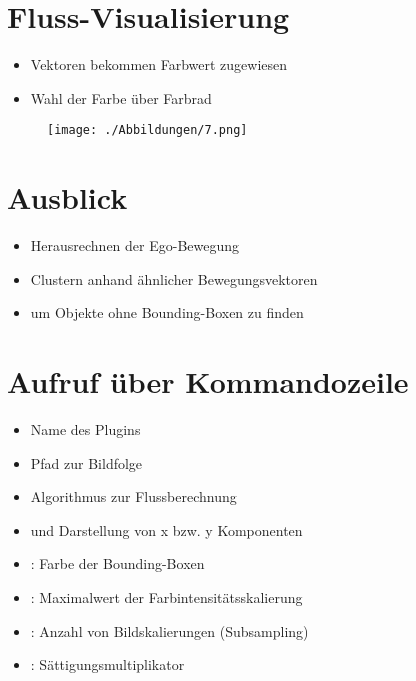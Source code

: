 \documentclass[10pt]{beamer}
\begin{document}
\section{Fluss-Visualisierung}
\begin{frame}{\secname}

	\begin{itemize}
		\item Vektoren bekommen Farbwert zugewiesen
		\item Wahl der Farbe über Farbrad
	\end{itemize}

		
	\begin{figure}[h]
	\centering
	\texttt{[image: ./Abbildungen/7.png]}
	\label{img:bsp4}
	\end{figure}

\end{frame}

\section{Ausblick}
\begin{frame}{\secname}
\begin{itemize}
	\item Herausrechnen der Ego-Bewegung
	\item Clustern anhand ähnlicher Bewegungsvektoren
	\item um Objekte ohne Bounding-Boxen zu finden
\end{itemize}
\end{frame}

\section{Aufruf über Kommandozeile}
\begin{frame}{\secname}
	
	
	\begin{itemize}
		\item {} Name des Plugins
		\item {} Pfad zur Bildfolge
		\item {} Algorithmus zur Flussberechnung
		\item {} und  Darstellung von x bzw. y Komponenten
		
		\item{}: Farbe der Bounding-Boxen
		
		\item{}: Maximalwert der Farbintensitätsskalierung
		
		\item{}: Anzahl von Bildskalierungen (Subsampling)
		
		\item{}: Sättigungsmultiplikator
	\end{itemize}
	
\end{frame}
\end{document}
